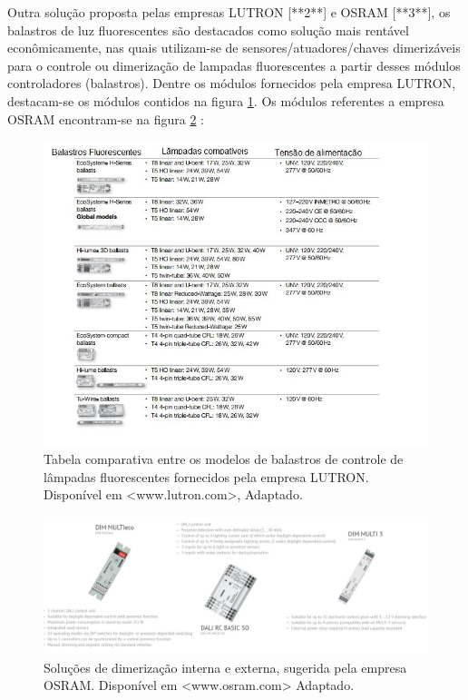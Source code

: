 Outra solução proposta pelas empresas LUTRON [**2**] e OSRAM [**3**], os balastros de luz fluorescentes são destacados como solução mais rentável econômicamente, nas quais utilizam-se de sensores/atuadores/chaves dimerizáveis para o controle ou dimerização de lampadas fluorescentes a partir desses módulos controladores (balastros). Dentre os módulos fornecidos pela empresa LUTRON, destacam-se os módulos contidos na figura \ref{fig:tabelabalastros}.  Os módulos referentes a empresa OSRAM encontram-se na figura \ref{fig:solucaodimerizacao} :
 
\begin{figure}[!h]
	\centering
	\includegraphics[width=1.0\textwidth]{figuras/tabelaBalastros.jpeg}
	\caption{Tabela comparativa entre os modelos de balastros de controle de lâmpadas fluorescentes fornecidos pela empresa LUTRON. Disponível em <www.lutron.com>, Adaptado.}
	\label{fig:tabelabalastros}
\end{figure}

\begin{figure}[!h]
	\centering
	\includegraphics[width=1.0\textwidth]{figuras/solucaoDimerizacao.jpeg}
	\caption{Soluções de dimerização interna e externa, sugerida pela empresa OSRAM. Disponível em <www.osram.com> Adaptado.}
	\label{fig:solucaodimerizacao}
\end{figure}

